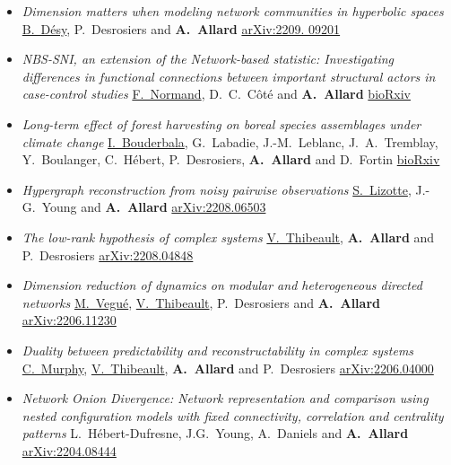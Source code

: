 \documentclass[11pt]{article}
\begin{document}
\begin{itemize}[itemsep=0.5em]\small
%
  \item \textit{Dimension matters when modeling network communities in hyperbolic spaces}\split
  \uline{B.~Désy}, P.~Desrosiers and \textbf{A.~Allard}\split
  \href{https://arxiv.org/abs/2209.09201}{arXiv:2209. 09201}
%
  \item \textit{NBS-SNI, an extension of the Network-based statistic: Investigating differences in functional connections between important structural actors in case-control studies}\split
  \uline{F.~Normand}, D.~C.~Côté and \textbf{A.~Allard}\split
  \href{https://doi.org/10.1101/2022.08.29.505749}{bioRxiv}
%
  \item \textit{Long-term effect of forest harvesting on boreal species assemblages under climate change}\split
  \uline{I.~Bouderbala}, G.~Labadie, J.-M.~Leblanc, J.~A.~Tremblay, Y.~Boulanger, C.~Hébert, P.~Desrosiers, \textbf{A.~Allard} and D.~Fortin\split
  \href{https://doi.org/10.1101/2022.08.21.504664}{bioRxiv}
%
  \item \textit{Hypergraph reconstruction from noisy pairwise observations}\split
  \uline{S.~Lizotte}, J.-G.~Young and \textbf{A.~Allard}\split
  \href{https://arxiv.org/abs/2208.06503}{arXiv:2208.06503}
%
  \item \textit{The low-rank hypothesis of complex systems}\split
  \uline{V.~Thibeault}, \textbf{A.~Allard} and P.~Desrosiers\split
  \href{https://arxiv.org/abs/2208.04848}{arXiv:2208.04848}
%
  \item \textit{Dimension reduction of dynamics on modular and heterogeneous directed networks}\split
  \uline{M.~Vegué}, \uline{V.~Thibeault}, P.~Desrosiers and \textbf{A.~Allard}\split
  \href{https://arxiv.org/abs/2206.11230}{arXiv:2206.11230}
%
  \item \textit{Duality between predictability and reconstructability in complex systems}\split
  \uline{C.~Murphy}, \uline{V.~Thibeault}, \textbf{A.~Allard} and P.~Desrosiers\split
  \href{https://arxiv.org/abs/2206.04000}{arXiv:2206.04000}
%
  \item \textit{Network Onion Divergence: Network representation and comparison using nested configuration models with fixed connectivity, correlation and centrality patterns}\split
  L.~Hébert-Dufresne, J.G.~Young, A.~Daniels and \textbf{A.~Allard}\split
  \href{https://arxiv.org/abs/2204.08444}{arXiv:2204.08444}
%

\end{itemize}
\end{document}
